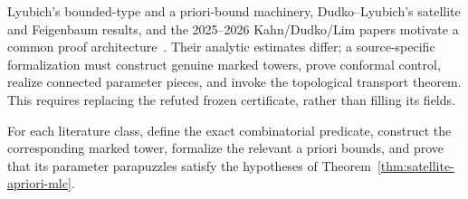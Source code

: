 Lyubich's bounded-type and a priori-bound machinery, Dudko--Lyubich's
satellite and Feigenbaum results, and the 2025--2026 Kahn/Dudko/Lim papers
motivate a common proof architecture~\cite{LyubichDynamics,LyubichIII}.
Their analytic estimates differ; a source-specific formalization must
construct genuine marked towers, prove conformal control, realize
connected parameter pieces, and invoke the topological transport
theorem.  This requires replacing the refuted frozen certificate,
rather than filling its fields.

\begin{formalobligation}
\label{est:renormalization}
For each literature class, define the exact combinatorial predicate,
construct the corresponding marked tower, formalize the relevant a priori
bounds, and prove that its parameter parapuzzles satisfy the hypotheses of
Theorem~\ref{thm:satellite-apriori-mlc}.
\end{formalobligation}
